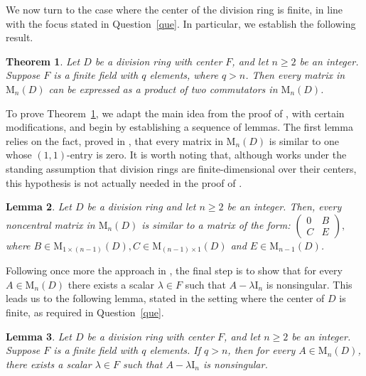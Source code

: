 \documentclass[11pt]{article}
\newtheorem{theorem}{Theorem}
\newtheorem{lemma}[theorem]{Lemma}
\theoremstyle{definition}
\begin{document}
{{{{				We now turn to the case where the center of the division ring is finite, in line with the focus stated in Question~\ref{que}. In particular, we establish the following result.
				
				\begin{theorem} \label{q>n}
					Let $D$ be a division ring with center $F$, and let $n \ge 2$ be an integer. Suppose $F$ is a finite field with $q$ elements, where $q > n$. Then every matrix in $\mathrm{M}_n(D)$ can be expressed as a product of two commutators in $\mathrm{M}_n(D)$.
				\end{theorem}
				
				To prove Theorem~\ref{q>n}, we adapt the main idea from the proof of \cite[Theorem~4.4]{Pa_Bre_25}, with certain modifications, and begin by establishing a sequence of lemmas. The first lemma relies on the fact, proved in \cite[Proposition 1.8]{Pa_AmiRow_94}, that every matrix in $\mathrm{M}_n(D)$ is similar to one whose $(1,1)$-entry is zero.  It is worth noting that, although \cite{Pa_AmiRow_94} works under the standing assumption that division rings are finite-dimensional over their centers, this hypothesis is not actually needed in the proof of \cite[Proposition 1.8]{Pa_AmiRow_94}.
				
				\begin{lemma} {\rm \cite[Proposition 1.8]{Pa_AmiRow_94}}\label{Rowen}
					Let $D$ be a division ring and let $n\geq2$ be an integer. Then, every noncentral matrix in $\mathrm{M}_n(D)$ is similar to a matrix of the form: $\begin{pmatrix}
						0&B\\
						C&E
					\end{pmatrix},$ where $B\in\mathrm{M}_{1\times (n-1)}(D), C\in\mathrm{M}_{(n-1)\times1}(D)$ and $E\in\mathrm{M}_{n-1}(D)$.
				\end{lemma}
				
				Following once more the approach in \cite[Theorem 4.4]{Pa_Bre_25}, the final step is to show that for every $A \in \mathrm{M}_n(D)$ there exists a scalar $\lambda \in F$ such that $A - \lambda \mathrm{I}_n$ is nonsingular. This leads us to the following lemma, stated in the setting where the center of $D$ is finite, as required in Question~\ref{que}.
				
				\begin{lemma}\label{lemma in}
					Let $D$ be a division ring with center $F$, and let $n \ge 2$ be an integer. Suppose $F$ is a finite field with $q$ elements. If $q > n$, then for every $A \in \mathrm{M}_n(D)$, there exists a scalar $\lambda \in F$ such that $A - \lambda \mathrm{I}_n$ is nonsingular.
				\end{lemma}
				
}}}}
\end{document}
